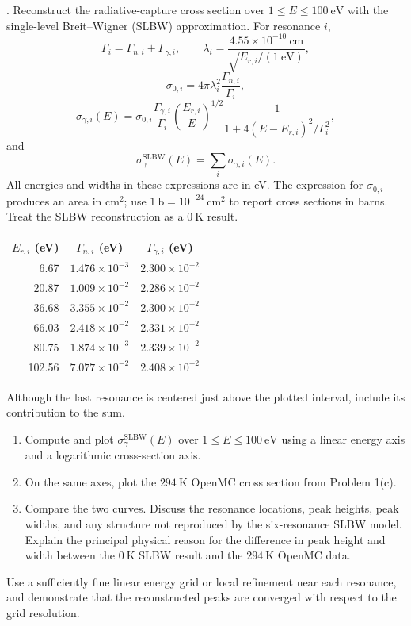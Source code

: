 . Reconstruct the  radiative-capture
cross section over $1\leq E\leq100~\mathrm{eV}$ with the single-level
Breit--Wigner (SLBW) approximation. For resonance $i$,
\[
 \Gamma_i=\Gamma_{n,i}+\Gamma_{\gamma,i},
 \qquad
 \lambda_i=\frac{4.55\times10^{-10}~\mathrm{cm}}
 {\sqrt{E_{r,i}/(1~\mathrm{eV})}},
\]
\[
 \sigma_{0,i}=4\pi\lambda_i^2\frac{\Gamma_{n,i}}{\Gamma_i},
\]
\[
 \sigma_{\gamma,i}(E)
 =\sigma_{0,i}\frac{\Gamma_{\gamma,i}}{\Gamma_i}
 \left(\frac{E_{r,i}}{E}\right)^{1/2}
 \frac{1}{1+4(E-E_{r,i})^2/\Gamma_i^2},
\]
and
\[
 \sigma_\gamma^{\mathrm{SLBW}}(E)=\sum_i\sigma_{\gamma,i}(E).
\]
All energies and widths in these expressions are in eV. The expression for
$\sigma_{0,i}$ produces an area in $\mathrm{cm^2}$; use
$1~\mathrm{b}=10^{-24}~\mathrm{cm^2}$ to report cross sections in barns.
Treat the SLBW reconstruction as a $0~\mathrm{K}$ result.

\begin{center}
\begin{tabular}{rcc}
\toprule
$E_{r,i}$ (eV)&$\Gamma_{n,i}$ (eV)&$\Gamma_{\gamma,i}$ (eV)\\
\midrule
6.67   &$1.476\times10^{-3}$&$2.300\times10^{-2}$\\
20.87  &$1.009\times10^{-2}$&$2.286\times10^{-2}$\\
36.68  &$3.355\times10^{-2}$&$2.300\times10^{-2}$\\
66.03  &$2.418\times10^{-2}$&$2.331\times10^{-2}$\\
80.75  &$1.874\times10^{-3}$&$2.339\times10^{-2}$\\
102.56 &$7.077\times10^{-2}$&$2.408\times10^{-2}$\\
\bottomrule
\end{tabular}
\end{center}
Although the last resonance is centered just above the plotted interval,
include its contribution to the sum.

\begin{enumerate}[label=(\alph*)]
\item Compute and plot $\sigma_\gamma^{\mathrm{SLBW}}(E)$ over
$1\leq E\leq100~\mathrm{eV}$ using a linear energy axis and a logarithmic
cross-section axis.
\item On the same axes, plot the $294~\mathrm{K}$ OpenMC cross section from
Problem 1(c).
\item Compare the two curves. Discuss the resonance locations, peak heights,
peak widths, and any structure not reproduced by the six-resonance SLBW
model. Explain the principal physical reason for the difference in peak
height and width between the $0~\mathrm{K}$ SLBW result and the
$294~\mathrm{K}$ OpenMC data.
\end{enumerate}
Use a sufficiently fine linear energy grid or local refinement near each
resonance, and demonstrate that the reconstructed peaks are converged with
respect to the grid resolution.

